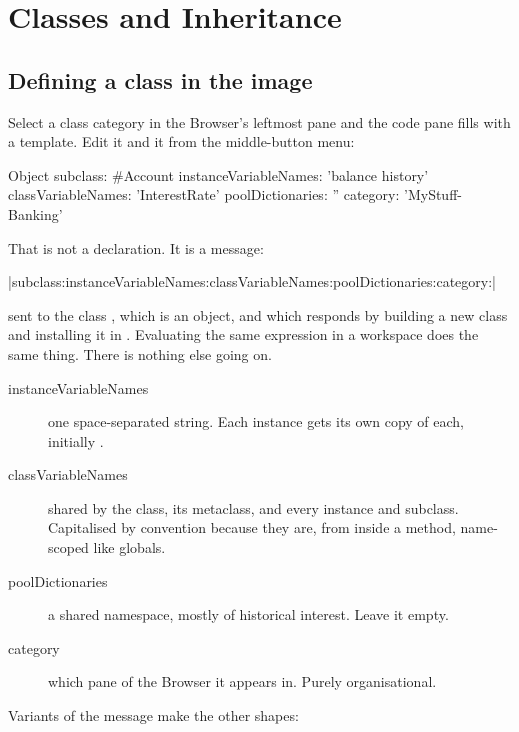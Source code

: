 \chapter{Classes and Inheritance}
\label{ch:classes}


\section{Defining a class in the image}

Select a class category in the Browser's leftmost pane and the code pane fills
with a template. Edit it and  it from the middle-button menu:

\begin{st}
Object subclass: #Account
    instanceVariableNames: 'balance history'
    classVariableNames: 'InterestRate'
    poolDictionaries: ''
    category: 'MyStuff-Banking'
\end{st}

That is not a declaration. It is a message:

\begin{center}
\ct|subclass:instanceVariableNames:classVariableNames:poolDictionaries:category:|
\end{center}

\noindent sent to the class , which is an object, and which responds
by building a new class and installing it in . Evaluating the same expression in a workspace does the
same thing. There is nothing else going on.

\begin{description}
\item[instanceVariableNames] one space-separated string. Each instance gets
  its own copy of each, initially .
\item[classVariableNames] shared by the class, its metaclass, and every
  instance and subclass. Capitalised by convention because they are, from
  inside a method, name-scoped like globals.
\item[poolDictionaries] a shared namespace, mostly of historical interest.
  Leave it empty.
\item[category] which pane of the Browser it appears in. Purely
  organisational.
\end{description}

Variants of the message make the other shapes:

